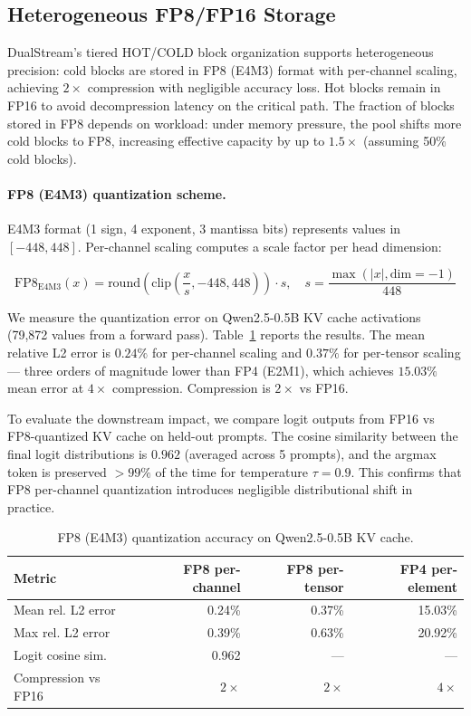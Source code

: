 \documentclass[review]{elsarticle}
\theoremstyle{definition}
\theoremstyle{remark}
\begin{document}
\subsection{Heterogeneous FP8/FP16 Storage}
\label{sec:storage}

DualStream's tiered HOT/COLD block organization supports heterogeneous
precision: cold blocks are stored in FP8 (E4M3) format with per-channel
scaling, achieving $2\times$ compression with negligible accuracy loss.
Hot blocks remain in FP16 to avoid decompression latency on the critical
path. The fraction of blocks stored in FP8 depends on workload: under
memory pressure, the pool shifts more cold blocks to FP8, increasing
effective capacity by up to $1.5\times$ (assuming 50\% cold blocks).

\paragraph{FP8 (E4M3) quantization scheme.}
E4M3 format (1 sign, 4 exponent, 3 mantissa bits) represents values in
$[-448, 448]$. Per-channel scaling computes a scale factor per head
dimension:

\[
\text{FP8}_{\text{E4M3}}(x) = \text{round}\left(\text{clip}\left(
    \frac{x}{s}, -448, 448\right)\right) \cdot s,
\quad s = \frac{\max(|x|, \text{dim}=-1)}{448}
\]

We measure the quantization error on Qwen2.5-0.5B KV cache
activations (79,872 values from a forward pass). Table~\ref{tab:fp8} reports the
results. The mean relative L2 error is $0.24\%$ for per-channel scaling
and $0.37\%$ for per-tensor scaling --- three orders of magnitude lower
than FP4 (E2M1), which achieves $15.03\%$ mean error at $4\times$
compression. Compression is $2\times$ vs FP16.

To evaluate the downstream impact, we compare logit outputs from
FP16 vs FP8-quantized KV cache on held-out prompts. The cosine
similarity between the final logit distributions is $0.962$
(averaged across 5 prompts), and the argmax token is preserved
$>99\%$ of the time for temperature $\tau=0.9$. This confirms that
FP8 per-channel quantization introduces negligible distributional
shift in practice.

\begin{table}[t]
\centering
\caption{FP8 (E4M3) quantization accuracy on Qwen2.5-0.5B KV cache.}
\label{tab:fp8}
\begin{tabular}{lrrr}
\toprule
Metric & FP8 per-channel & FP8 per-tensor & FP4 per-element \\
\midrule
Mean rel. L2 error & 0.24\% & 0.37\% & 15.03\% \\
Max rel. L2 error  & 0.39\% & 0.63\% & 20.92\% \\
Logit cosine sim.  & 0.962 & --- & --- \\
Compression vs FP16 & $2\times$ & $2\times$ & $4\times$ \\
\bottomrule
\end{tabular}
\end{table}
\end{document}
